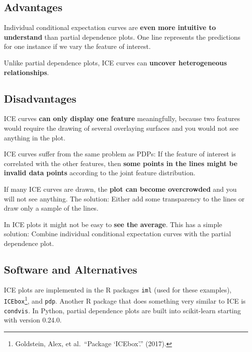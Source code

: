 \documentclass[
  12pt,
]{krantz}
\begin{document}
\hypertarget{advantages-12}{%
\subsection{Advantages}\label{advantages-12}}

Individual conditional expectation curves are \textbf{even more intuitive to understand} than partial dependence plots.
One line represents the predictions for one instance if we vary the feature of interest.

Unlike partial dependence plots, ICE curves can \textbf{uncover heterogeneous relationships}.

\hypertarget{disadvantages-12}{%
\subsection{Disadvantages}\label{disadvantages-12}}

ICE curves \textbf{can only display one feature} meaningfully, because two features would require the drawing of several overlaying surfaces and you would not see anything in the plot.

ICE curves suffer from the same problem as PDPs:
If the feature of interest is correlated with the other features, then \textbf{some points in the lines might be invalid data points} according to the joint feature distribution.

If many ICE curves are drawn, the \textbf{plot can become overcrowded} and you will not see anything.
The solution: Either add some transparency to the lines or draw only a sample of the lines.

In ICE plots it might not be easy to \textbf{see the average}.
This has a simple solution:
Combine individual conditional expectation curves with the partial dependence plot.

\hypertarget{software-and-alternatives-3}{%
\subsection{Software and Alternatives}\label{software-and-alternatives-3}}

ICE plots are implemented in the R packages \texttt{iml} (used for these examples), \texttt{ICEbox}\footnote{Goldstein, Alex, et al.~``Package `ICEbox'.'' (2017).}, and \texttt{pdp}.
Another R package that does something very similar to ICE is \texttt{condvis}. In Python, partial dependence plots are built into scikit-learn starting with version 0.24.0.
\end{document}

